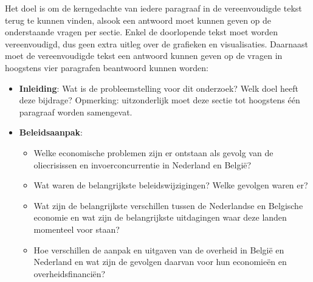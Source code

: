 \documentclass{report}
\begin{document}
	Het doel is om de kerngedachte van iedere paragraaf in de vereenvoudigde tekst terug te kunnen vinden, alsook een antwoord moet kunnen geven op de onderstaande vragen per sectie. Enkel de doorlopende tekst moet worden vereenvoudigd, dus geen extra uitleg over de grafieken en visualisaties. Daarnaast moet de vereenvoudigde tekst een antwoord kunnen geven op de vragen in hoogstens vier paragrafen beantwoord kunnen worden:
	
	\begin{itemize}
		\item \textbf{Inleiding}: Wat is de probleemstelling voor dit onderzoek? Welk doel heeft deze bijdrage? Opmerking: uitzonderlijk moet deze sectie tot hoogstens één paragraaf worden samengevat.
		\item \textbf{Beleidsaanpak}: 
		\begin{itemize}
			\item Welke economische problemen zijn er ontstaan als gevolg van de oliecrisissen en invoerconcurrentie in Nederland en België?
			\item Wat waren de belangrijkste beleidswijzigingen? Welke gevolgen waren er?
			\item Wat zijn de belangrijkste verschillen tussen de Nederlandse en Belgische economie en wat zijn de belangrijkste uitdagingen waar deze landen momenteel voor staan?
			\item Hoe verschillen de aanpak en uitgaven van de overheid in België en Nederland en wat zijn de gevolgen daarvan voor hun economieën en overheidsfinanciën?
		\end{itemize}


\end{itemize}
\end{document}
